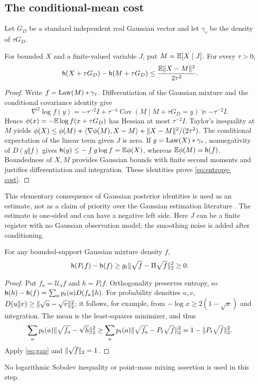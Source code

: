 \subsection{The conditional-mean cost}
Let $G_D$ be a standard independent real Gaussian vector and let
$\gamma_\tau$ be the density of $\tau G_D$.
\begin{lemma}\label{lem:centroid}
For bounded $X$ and a finite-valued variable $J$, put $M=\mathbb E[X\mid J]$.
For every $\tau>0$,
\begin{equation}\label{eq:entropy-cost}
 \mathsf h(X+\tau G_D)-\mathsf h(M+\tau G_D)
       \le\frac{\mathbb E\lVert X-M\rVert^2}{2\tau^2}.
\end{equation}
\end{lemma}
\begin{proof}
Write $f=\operatorname{Law}(M)*\gamma_\tau$. Differentiation of the Gaussian mixture
and the conditional covariance identity give
\begin{equation}\label{eq:hessian}
 \nabla^2\log f(y)=-\tau^{-2}I+
 \tau^{-4}\operatorname{Cov}(M\mid M+\tau G_D=y)\succeq-\tau^{-2}I.
\end{equation}
Hence $\phi(x)=-\mathbb E\log f(x+\tau G_D)$ has Hessian at most
$\tau^{-2}I$. Taylor's inequality at $M$ yields
$\phi(X)\le\phi(M)+\langle\nabla\phi(M),X-M\rangle+
\lVert X-M\rVert^2/(2\tau^2)$. The conditional expectation of the linear
term given $J$ is zero. If $g=\operatorname{Law}(X)*\gamma_\tau$, nonnegativity of
$D(g\Vert f)$ gives $\mathsf h(g)\le-\int g\log f=\mathbb E\phi(X)$,
whereas $\mathbb E\phi(M)=\mathsf h(f)$. Boundedness of $X,M$ provides Gaussian
bounds with finite second moments and justifies differentiation and
integration. These identities prove \eqref{eq:entropy-cost}.
\end{proof}
This elementary consequence of Gaussian posterior identities is used
as an estimate, not as a claim of priority over the Gaussian estimation
literature \cite{AKG,PW}. The estimate is one-sided and can have a
negative left side. Here $J$ can be a finite register with no Gaussian
observation model; the smoothing noise is added after conditioning.

\begin{lemma}
\label{lem:production}
For any bounded-support Gaussian mixture density $f$,
\begin{equation}\label{eq:production}
 \mathsf h(P_t f)-\mathsf h(f)\ge g_t\lVert\sqrt f-\Pi\sqrt f\rVert_2^2\ge0.
\end{equation}
\end{lemma}
\begin{proof}
Put $f_a=\mathcal U_a f$ and $h=P_t f$. Orthogonality preserves entropy,
so $\mathsf h(h)-\mathsf h(f)=\sum_a p_t(a)D(f_a\Vert h)$.
For probability densities $u,v$,
$D(u\Vert v)\ge\lVert\sqrt u-\sqrt v\rVert_2^2$; it follows, for example,
from $-\log x\ge2(1-\sqrt x)$ and integration. The mean is the
least-squares minimizer, and thus
\[
 \sum_a p_t(a)\lVert\sqrt{f_a}-\sqrt h\rVert_2^2
 \ge\sum_a p_t(a)\lVert\sqrt{f_a}-P_t\sqrt f\rVert_2^2
 =1-\lVert P_t\sqrt f\rVert_2^2.
\]
Apply \eqref{eq:gap} and $\lVert\sqrt f\rVert_2=1$.
\end{proof}
No logarithmic Sobolev inequality or point-mass mixing assertion is
used in this step.

